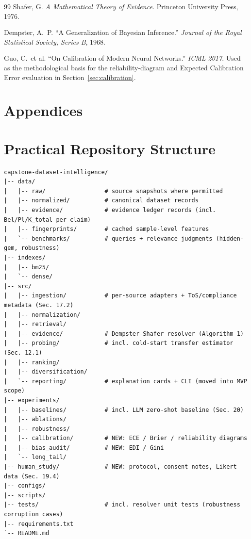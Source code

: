 \documentclass[11pt]{article}
\begin{document}
\begin{thebibliography}{99}
 Shafer, G. \textit{A Mathematical Theory of Evidence.} Princeton University Press,
1976.

 Dempster, A.\ P. ``A Generalization of Bayesian Inference.'' \textit{Journal of the
Royal Statistical Society, Series B}, 1968.

 Guo, C.\ et al. ``On Calibration of Modern Neural Networks.'' \textit{ICML
2017}. Used as the methodological basis for the reliability-diagram and Expected Calibration Error
evaluation in Section~\ref{sec:calibration}.

\end{thebibliography}

\newpage
\appendix
\section*{Appendices}

\section{Practical Repository Structure}
\begin{lstlisting}[basicstyle=\ttfamily\footnotesize]
capstone-dataset-intelligence/
|-- data/
|   |-- raw/                 # source snapshots where permitted
|   |-- normalized/          # canonical dataset records
|   |-- evidence/            # evidence ledger records (incl. Bel/Pl/K_total per claim)
|   |-- fingerprints/        # cached sample-level features
|   `-- benchmarks/          # queries + relevance judgments (hidden-gem, robustness)
|-- indexes/
|   |-- bm25/
|   `-- dense/
|-- src/
|   |-- ingestion/           # per-source adapters + ToS/compliance metadata (Sec. 17.2)
|   |-- normalization/
|   |-- retrieval/
|   |-- evidence/            # Dempster-Shafer resolver (Algorithm 1)
|   |-- probing/             # incl. cold-start transfer estimator (Sec. 12.1)
|   |-- ranking/
|   |-- diversification/
|   `-- reporting/           # explanation cards + CLI (moved into MVP scope)
|-- experiments/
|   |-- baselines/           # incl. LLM zero-shot baseline (Sec. 20)
|   |-- ablations/
|   |-- robustness/
|   |-- calibration/         # NEW: ECE / Brier / reliability diagrams
|   |-- bias_audit/          # NEW: EDI / Gini
|   `-- long_tail/
|-- human_study/             # NEW: protocol, consent notes, Likert data (Sec. 19.4)
|-- configs/
|-- scripts/
|-- tests/                   # incl. resolver unit tests (robustness corruption cases)
|-- requirements.txt
`-- README.md
\end{lstlisting}
\end{document}
